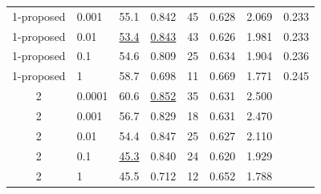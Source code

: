 \documentclass[12pt]{jarticle}
\numberwithin{equation}{section}    %
\numberwithin{figure}{section}      %
\numberwithin{table}{section}      %
\begin{document}
\begin{table}[bt]
\begin{center}
{\begin{tabular}{|c|l|rrrrrr|}
                1-proposed               & 0.001                                    & 55.1                         & 0.842                     & 45                         & 0.628                         & 2.069                             & 0.233                              \\
                1-proposed               & 0.01                                     & \underline{53.4}             & \underline{0.843}         & 43                         & 0.626                         & 1.981                             & 0.233                              \\
                1-proposed               & 0.1                                      & 54.6                         & 0.809                     & 25                         & 0.634                         & 1.904                             & 0.236                              \\
                1-proposed               & 1                                        & 58.7                         & 0.698                     & 11                         & 0.669                         & 1.771                             & 0.245                              \\
                \hline
                2                        & 0.0001                                   & 60.6                         & \underline{0.852}         & 35                         & 0.631                         & 2.500                             &                                    \\
                2                        & 0.001                                    & 56.7                         & 0.829                     & 18                         & 0.631                         & 2.470                             &                                    \\
                2                        & 0.01                                     & 54.4                         & 0.847                     & 25                         & 0.627                         & 2.110                             &                                    \\
                2                        & 0.1                                      & \underline{45.3}             & 0.840                     & 24                         & 0.620                         & 1.929                             &                                    \\
                2                        & 1                                        & 45.5                         & 0.712                     & 12                         & 0.652                         & 1.788                             &                                    \\

\end{tabular}}
\end{center}
\end{table}
\end{document}
